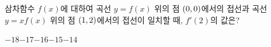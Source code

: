 삼차함수 $f(x)$에 대하여 곡선 $y=f(x)$ 위의 점 $(0{,}\mkern3mu\mathopen{}0)$에서의 접선과 곡선 $y=xf(x)$ 위의 점 $(1{,}\mkern3mu\mathopen{}2)$에서의 접선이 일치할 때, $f'(2)$의 값은?
\begin{choices32}{$-18$}{$-17$}{$-16$}{$-15$}{$-14$}\end{choices32}
